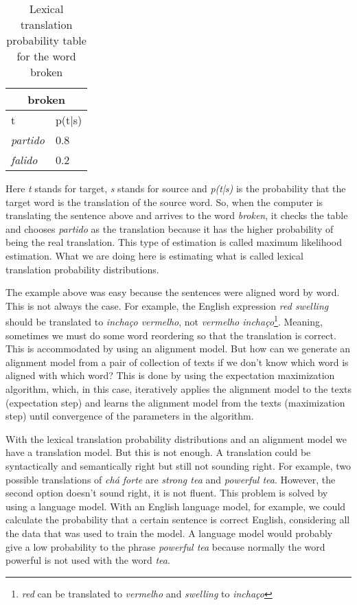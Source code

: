\begin{table}[ht]
\centering
\begin{tabular}{ll}
\multicolumn{2}{c}{\textbf{broken}} \\ \hline
t                     & p(t|s)      \\ \hline
\textit{partido}      & 0.8         \\
\textit{falido}       & 0.2         \\ \hline
\end{tabular}
\caption{Lexical translation probability table for the word broken}
\label{table:translation-prob-table}
\end{table}

Here \textit{t} stands for target, \textit{s} stands for source and \textit{p(t|s)} is the probability that the target word is the translation of the source word. So, when the computer is translating the sentence above and arrives to the word \textit{broken}, it checks the table and chooses \textit{partido} as the translation because it has the higher probability of being the real translation. This type of estimation is called maximum likelihood estimation. What we are doing here is estimating what is called lexical translation probability distributions.

The example above was easy because the sentences were aligned word by word. This is not always the case. For example, the English expression \textit{red swelling} should be translated to \textit{inchaço vermelho}, not \textit{vermelho inchaço}\footnote{\textit{red} can be translated to \textit{vermelho} and \textit{swelling} to \textit{inchaço}}. Meaning, sometimes we must do some word reordering so that the translation is correct. This is accommodated by using an alignment model. But how can we generate an alignment model from a pair of collection of texts if we don't know which word is aligned with which word? This is done by using the expectation maximization algorithm, which, in this case, iteratively applies the alignment model to the texts (expectation step) and learns the alignment model from the texts (maximization step) until convergence of the parameters in the algorithm.

With the lexical translation probability distributions and an alignment model we have a translation model. But this is not enough. A translation could be syntactically and semantically right but still not sounding right. For example, two possible translations of \textit{chá forte} are \textit{strong tea} and \textit{powerful tea}. However, the second option doesn't sound right, it is not fluent. This problem is solved by using a language model. With an English language model, for example, we could calculate the probability that a certain sentence is correct English, considering all the data that was used to train the model. A language model would probably give a low probability to the phrase \textit{powerful tea} because normally the word powerful is not used with the word \textit{tea}.

